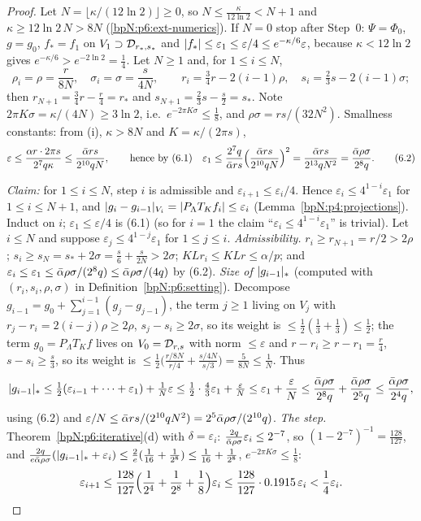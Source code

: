 \begin{proof}
\label{stepN:p6:nf-N} Let $N=\lfloor\kappa/(12\ln2)\rfloor\ge0$, so $N\le\frac\kappa{12\ln2}<N+1$ and $\kappa\ge12\ln2\,N>8N$ (\ref{bpN:p6:ext-numerics}). If $N=0$ stop after Step~0: $\Psi=\Phi_0$, $g=g_0$, $f_*=f_1$ on $V_1\supset\mathcal D_{r_*,s_*}$ and $\lvert f_*\rvert\le\varepsilon_1\le\varepsilon/4\le e^{-\kappa/6}\varepsilon$, because $\kappa<12\ln2$ gives $e^{-\kappa/6}>e^{-2\ln2}=\frac14$. Let $N\ge1$ and, for $1\le i\le N$,
\[\rho_i=\rho=\frac r{8N},\quad\sigma_i=\sigma=\frac s{4N},\qquad r_i=\tfrac34r-2(i-1)\rho,\quad s_i=\tfrac23s-2(i-1)\sigma;\]
then $r_{N+1}=\frac34r-\frac r4=r_*$ and $s_{N+1}=\frac23s-\frac s2=s_*$. Note $2\pi K\sigma=\kappa/(4N)\ge3\ln2$, i.e.\ $e^{-2\pi K\sigma}\le\frac18$, and $\rho\sigma=rs/(32N^2)$. Smallness constants: from (i), $\kappa>8N$ and $K=\kappa/(2\pi s)$,
\[\varepsilon\le\frac{\alpha r\cdot2\pi s}{2^7q\kappa}\le\frac{\bar\alpha rs}{2^{10}qN},\qquad \text{hence by (6.1)}\quad\varepsilon_1\le\frac{2^7q}{\bar\alpha rs}\Bigl(\frac{\bar\alpha rs}{2^{10}qN}\Bigr)^2=\frac{\bar\alpha rs}{2^{13}qN^2}=\frac{\bar\alpha\rho\sigma}{2^8q}.\tag{6.2}\]

\label{stepN:p6:nf-induct} \emph{Claim:} for $1\le i\le N$, step $i$ is admissible and $\varepsilon_{i+1}\le\varepsilon_i/4$. Hence $\varepsilon_i\le4^{1-i}\varepsilon_1$ for $1\le i\le N+1$, and $\lvert g_i-g_{i-1}\rvert_{V_i}=\lvert P_\Lambda T_Kf_i\rvert\le\varepsilon_i$ (Lemma~\ref{bpN:p4:projections}).
Induct on $i$; $\varepsilon_1\le\varepsilon/4$ is (6.1) (so for $i=1$ the claim ``$\varepsilon_i\le4^{1-i}\varepsilon_1$'' is trivial). Let $i\le N$ and suppose $\varepsilon_j\le4^{1-j}\varepsilon_1$ for $1\le j\le i$.
\emph{Admissibility.} $r_i\ge r_{N+1}=r/2>2\rho$; $s_i\ge s_N=s_*+2\sigma=\frac s6+\frac s{2N}>2\sigma$; $KLr_i\le KLr\le\alpha/p$; and $\varepsilon_i\le\varepsilon_1\le\bar\alpha\rho\sigma/(2^8q)\le\bar\alpha\rho\sigma/(4q)$ by (6.2).
\emph{Size of $\lvert g_{i-1}\rvert_*$} (computed with $(r_i,s_i,\rho,\sigma)$ in Definition~\ref{bpN:p6:setting}). Decompose $g_{i-1}=g_0+\sum_{j=1}^{i-1}(g_j-g_{j-1})$, the term $j\ge1$ living on $V_j$ with $r_j-r_i=2(i-j)\rho\ge2\rho$, $s_j-s_i\ge2\sigma$, so its weight is $\le\frac12(\frac13+\frac13)\le\frac12$; the term $g_0=P_\Lambda T_Kf$ lives on $V_0=\mathcal D_{r,s}$ with norm $\le\varepsilon$ and $r-r_i\ge r-r_1=\frac r4$, $s-s_i\ge\frac s3$, so its weight is $\le\frac12\bigl(\frac{r/8N}{r/4}+\frac{s/4N}{s/3}\bigr)=\frac5{8N}\le\frac1N$. Thus
\[\lvert g_{i-1}\rvert_*\le\tfrac12(\varepsilon_{i-1}+\dots+\varepsilon_1)+\tfrac1N\varepsilon\le\tfrac12\cdot\tfrac43\varepsilon_1+\tfrac\varepsilon N\le\varepsilon_1+\frac\varepsilon N\le\frac{\bar\alpha\rho\sigma}{2^8q}+\frac{\bar\alpha\rho\sigma}{2^5q}\le\frac{\bar\alpha\rho\sigma}{2^4q},\]
using (6.2) and $\varepsilon/N\le\bar\alpha rs/(2^{10}qN^2)=2^5\bar\alpha\rho\sigma/(2^{10}q)$.
\emph{The step.} Theorem~\ref{bpN:p6:iterative}(d) with $\delta=\varepsilon_i$: $\frac{2q}{\bar\alpha\rho\sigma}\varepsilon_i\le2^{-7}$, so $(1-2^{-7})^{-1}=\frac{128}{127}$, and $\frac{2q}{e\bar\alpha\rho\sigma}(\lvert g_{i-1}\rvert_*+\varepsilon_i)\le\frac2e(\frac1{16}+\frac1{2^8})\le\frac1{16}+\frac1{2^8}$, $e^{-2\pi K\sigma}\le\frac18$:
\[\varepsilon_{i+1}\le\frac{128}{127}\Bigl(\frac1{2^4}+\frac1{2^8}+\frac18\Bigr)\varepsilon_i\le\frac{128}{127}\cdot0.1915\,\varepsilon_i<\frac14\varepsilon_i .\]


\end{proof}
